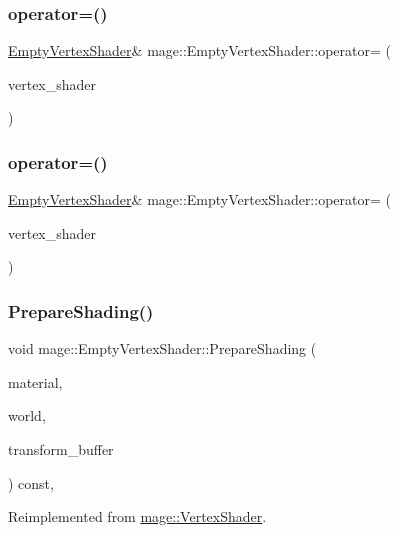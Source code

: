 \subsubsection{\texorpdfstring{operator=()}{operator=()}\hspace{0.1cm}{\footnotesize\ttfamily [1/2]}}
{\footnotesize\ttfamily \hyperlink{classmage_1_1_empty_vertex_shader}{Empty\+Vertex\+Shader}\& mage\+::\+Empty\+Vertex\+Shader\+::operator= (\begin{DoxyParamCaption}\item[{const \hyperlink{classmage_1_1_empty_vertex_shader}{Empty\+Vertex\+Shader} \&}]{vertex\+\_\+shader }\end{DoxyParamCaption})\hspace{0.3cm}{\ttfamily [delete]}}

\hypertarget{classmage_1_1_empty_vertex_shader_a449401b726fc5cd30012a3d8df2e0832}{}\label{classmage_1_1_empty_vertex_shader_a449401b726fc5cd30012a3d8df2e0832} 
\subsubsection{\texorpdfstring{operator=()}{operator=()}\hspace{0.1cm}{\footnotesize\ttfamily [2/2]}}
{\footnotesize\ttfamily \hyperlink{classmage_1_1_empty_vertex_shader}{Empty\+Vertex\+Shader}\& mage\+::\+Empty\+Vertex\+Shader\+::operator= (\begin{DoxyParamCaption}\item[{\hyperlink{classmage_1_1_empty_vertex_shader}{Empty\+Vertex\+Shader} \&\&}]{vertex\+\_\+shader }\end{DoxyParamCaption})\hspace{0.3cm}{\ttfamily [delete]}}

\hypertarget{classmage_1_1_empty_vertex_shader_a93db8bae83473934fb202aa499af586b}{}\label{classmage_1_1_empty_vertex_shader_a93db8bae83473934fb202aa499af586b} 
\subsubsection{\texorpdfstring{Prepare\+Shading()}{PrepareShading()}}
{\footnotesize\ttfamily void mage\+::\+Empty\+Vertex\+Shader\+::\+Prepare\+Shading (\begin{DoxyParamCaption}\item[{const \hyperlink{structmage_1_1_material}{Material} \&}]{material,  }\item[{const \hyperlink{classmage_1_1_world}{World} \&}]{world,  }\item[{const Transform\+Buffer \&}]{transform\+\_\+buffer }\end{DoxyParamCaption}) const\hspace{0.3cm}{\ttfamily [override]}, {\ttfamily [virtual]}}



Reimplemented from \hyperlink{classmage_1_1_vertex_shader_a15a8b2c1a1a4c8fde3ff903c999ec218}{mage\+::\+Vertex\+Shader}.

